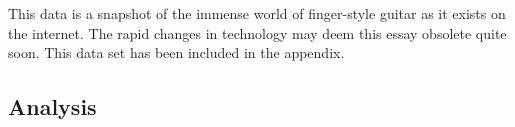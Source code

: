 \documentclass[unicode,hyperfootnotes=false,xetex,colorlinks=true,nofonts,nobib]{tufte-handout}
\begin{document}
This data is a snapshot of the immense world of finger-style guitar as it exists on the internet. The rapid changes in technology may deem this essay obsolete quite soon. This data set has been included in the appendix.
\subsection{Analysis}
\label{sec:analysis}
\end{document}
